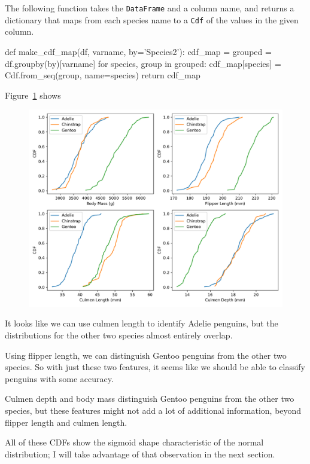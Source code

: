 \documentclass[12pt]{book}
\theoremstyle{exercise}
\newcommand{\py}[1]{{\tt #1}}%
\begin{document}
The following function takes the \py{DataFrame} and
a column name, and returns a dictionary that maps from each species name
to a \py{Cdf} of the values in the given column.

\begin{code}
def make_cdf_map(df, varname, by='Species2'):
    cdf_map = {}
    grouped = df.groupby(by)[varname]
    for species, group in grouped:
        cdf_map[species] = Cdf.from_seq(group, name=species)
    return cdf_map
\end{code}

Figure~\ref{fig10-01} shows

\begin{figure}
\centerline{\includegraphics[width=5.5in]{figs/fig10-01.pdf}}
\caption{}
\label{fig10-01}
\end{figure}

It looks like we can use culmen length to identify Adelie penguins, but
the distributions for the other two species almost entirely overlap.

Using flipper length, we can distinguish Gentoo penguins from the other
two species. So with just these two features, it seems like we should be
able to classify penguins with some accuracy.

Culmen depth and body mass distinguish Gentoo penguins from the other
two species, but these features might not add a lot of additional
information, beyond flipper length and culmen length.

All of these CDFs show the sigmoid shape characteristic of the normal
distribution; I will take advantage of that observation in the next
section.
\end{document}
